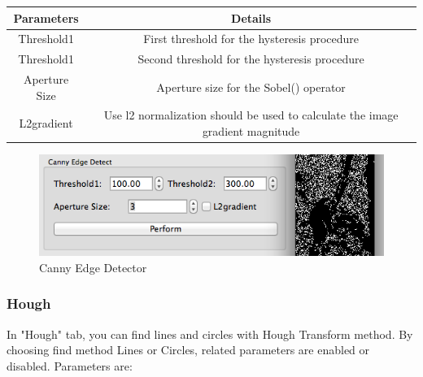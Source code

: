 \documentclass{article}
\begin{document}
\begin{table}[H]
\begin{center}
\begin{tabular}{|c|c|l|l|l|}
\hline
\textbf{Parameters} & \multicolumn{4}{|c|}{\textbf{Details}}                                                              \\ \hline
Threshold1          & \multicolumn{4}{|c|}{First threshold for the hysteresis procedure}                                  \\ \hline
Threshold1          & \multicolumn{4}{|c|}{Second threshold for the hysteresis procedure}                                 \\ \hline
Aperture Size       & \multicolumn{4}{|c|}{Aperture size for the Sobel() operator}                                        \\ \hline
L2gradient          & \multicolumn{4}{|c|}{Use l2 normalization should be used to calculate the image gradient magnitude} \\ \hline
\end{tabular}
\end{center}
\end{table}



\begin{figure}[H]
\begin{center}
\includegraphics[scale=0.5]{toolboxEdge.png}
\caption{Canny Edge Detector}
\end{center}
\end{figure}	

\subsubsection{Hough}
In "Hough" tab, you can find lines and circles with Hough Transform method. By choosing find method Lines or Circles, related parameters are enabled or disabled. Parameters are:
\end{document}
